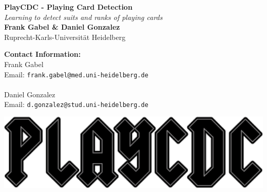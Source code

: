 \documentclass[a0,landscape]{a0poster}
\begin{document}


\begin{minipage}[b]{0.48\linewidth}
\veryHuge \color{NavyBlue} \textbf{PlayCDC - Playing Card Detection} \color{Black}\\ %
\Huge\textit{Learning to detect suits and ranks of playing cards}\\[1cm] %
\huge \textbf{Frank Gabel \& Daniel Gonzalez}\\ %
\huge Ruprecht-Karls-Universit\"at Heidelberg
\\ %
\end{minipage}
%
\begin{minipage}[b]{0.27\linewidth}
\color{DarkSlateGray}\Large \textbf{Contact Information:}\\
Frank Gabel\\ %
Email: \texttt{frank.gabel@med.uni-heidelberg.de}\
\\\\
Daniel Gonzalez \\
Email: \texttt{d.gonzalez@stud.uni-heidelberg.de}\\ %
\end{minipage}
%
\begin{minipage}[b]{0.45\linewidth}

\includegraphics[width=30cm]{playcdc.png} \vspace{3cm}%
\end{minipage}
\end{document}
